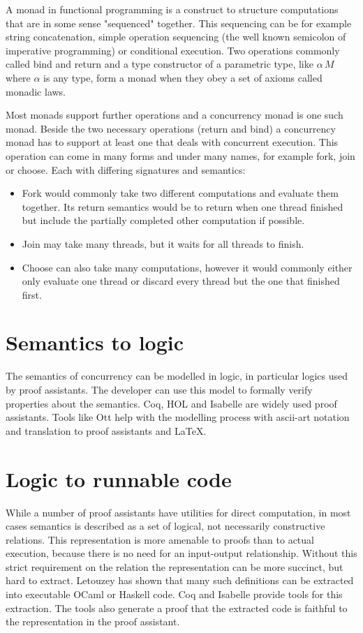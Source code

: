 \documentclass[12pt,twoside,notitlepage]{report}
\begin{document}
A monad\cite{hoareetal2001tackling} in functional programming is a construct to structure computations that are in some sense "sequenced" together. This sequencing can be for example string concatenation, simple operation sequencing (the well known semicolon of imperative programming) or conditional execution. Two operations commonly called bind and return and a type constructor of a parametric type, like $ \alpha \, M $ where $ \alpha $ is any type, form a monad when they obey a set of axioms called monadic laws.

Most monads support further operations and a concurrency monad is one such monad. Beside the two necessary operations (return and bind) a concurrency monad has to support at least one that deals with concurrent execution.  This operation can come in many forms and under many names, for example fork, join or choose. Each with differing signatures and semantics:
\begin{itemize}
\item{Fork would commonly take two different computations and evaluate them together. Its return semantics would be to return when one thread finished but include the partially completed other computation if possible.}
\item{Join may take many threads, but it waits for all threads to finish.}
\item{Choose can also take many computations, however it would commonly either only evaluate one thread or discard every thread but the one that finished first.}
\end{itemize}

\section{Semantics to logic}
The semantics of concurrency can be modelled in logic, in particular logics used by proof assistants. The developer can use this model to formally verify properties about the semantics\cite{benton2008mechanized,blazy2009mechanized,blazy2006formal,leroy2009formal}. Coq\cite{Coq}, HOL and Isabelle are widely used proof assistants. Tools like Ott\cite{Ott} help with the modelling process with ascii-art notation and translation to proof assistants and \LaTeX.


\section{Logic to runnable code}
While a number of proof assistants have utilities for direct computation, in most cases semantics is described as a set of logical, not necessarily constructive relations. This representation is more amenable to proofs than to actual execution, because there is no need for an input-output relationship. Without this strict requirement on the relation the representation can be more succinct, but hard to extract. Letouzey\cite{letouzey2008extraction} has shown that many such definitions can be extracted into executable OCaml or Haskell code.  Coq and Isabelle provide tools for this extraction. The tools also generate a proof that the extracted code is faithful to the representation in the proof assistant.
\end{document}
